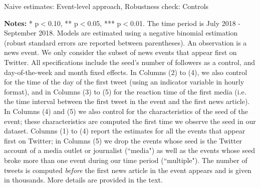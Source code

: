 \clearpage
\pagebreak
\begin{table}
\caption{Naive estimates: Event-level approach, Robustness check: Controls}
\begin{center}
	
\end{center}
\begin{spacing}{0.5}
	{\fns \textbf{Notes:} * p$<$0.10, ** p$<$0.05, *** p$<$0.01. The time period is July 2018 - September 2018.  Models are estimated using a negative binomial estimation (robust standard errors are reported between parentheses). An observation is a news event. We only consider the subset of news events that appear first on Twitter. All specifications include the seed's number of followers as a control, and day-of-the-week and month fixed effects. In Columns (2) to (4), we also control for the time of the day of the first tweet (using an indicator variable in hourly format), and in Columns (3) to (5) for the reaction time of the first media (i.e. the time interval between the first tweet in the event and the first news article). In Columns (4) and (5) we also control for the characteristics of the seed of the event; these characteristics are computed the first time we observe the seed in our dataset. Columns (1) to (4) report the estimates for all the events that appear first on Twitter; in Columns (5) we drop the events whose seed is the Twitter account of a media outlet or journalist (``media") as well as the events whose seed broke more than one event during our time period (``multiple"). The number of tweets is computed \textit{before} the first news article in the event appears and is given in thousands. More details are provided in the text.} 
\end{spacing}
\label{Tab:number_articles_negbinomial_event_RControls}
\end{table} 


